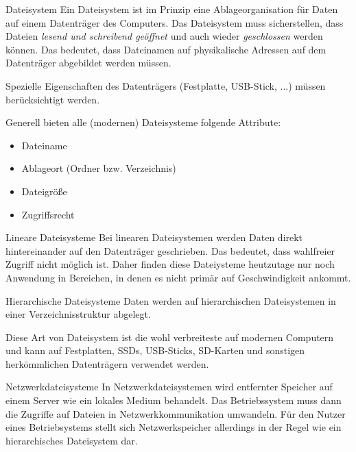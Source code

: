 \documentclass[german]{spicker}
\begin{document}
\begin{defi}{Dateisystem}
    Ein Dateisystem ist im Prinzip eine Ablageorganisation für Daten auf einem Datenträger des Computers.
    Das Dateisystem muss sicherstellen,
    dass Dateien \emph{lesend und schreibend geöffnet} und auch wieder \emph{geschlossen} werden
    können. Das bedeutet, dass Dateinamen auf physikalische Adressen auf dem
    Datenträger abgebildet werden müssen.

    Spezielle Eigenschaften des Datenträgers
    (Festplatte, USB-Stick, ...) müssen berücksichtigt werden.

    Generell bieten
    alle (modernen) Dateisysteme folgende Attribute:
    \begin{itemize}
        \item Dateiname
        \item Ablageort (Ordner bzw. Verzeichnis)
        \item Dateigröße
        \item Zugriffsrecht
    \end{itemize}
\end{defi}

\begin{defi}{Lineare Dateisysteme}
    Bei linearen Dateisystemen werden Daten direkt hintereinander auf den Datenträger
    geschrieben. Das bedeutet, dass wahlfreier Zugriff nicht möglich ist. Daher finden
    diese Dateiysteme heutzutage nur noch Anwendung in Bereichen, in denen es nicht
    primär auf Geschwindigkeit ankommt.
\end{defi}

\begin{defi}{Hierarchische Dateisysteme}
    Daten werden auf hierarchischen Dateisystemen in einer Verzeichnisstruktur
    abgelegt.

    Diese Art von Dateisystem ist die wohl verbreiteste auf
    modernen Computern und kann auf Festplatten, SSDs, USB-Sticks, SD-Karten und
    sonstigen herkömmlichen Datenträgern verwendet werden.
\end{defi}

\begin{defi}{Netzwerkdateisysteme}
    In Netzwerkdateisystemen wird entfernter
    Speicher auf einem Server wie ein lokales Medium behandelt. Das Betriebssystem
    muss dann die Zugriffe auf Dateien in Netzwerkkommunikation umwandeln.
    Für den Nutzer
    eines Betriebsystems stellt sich Netzwerkspeicher allerdings in der Regel wie ein
    hierarchisches Dateisystem dar.
\end{defi}
\end{document}
